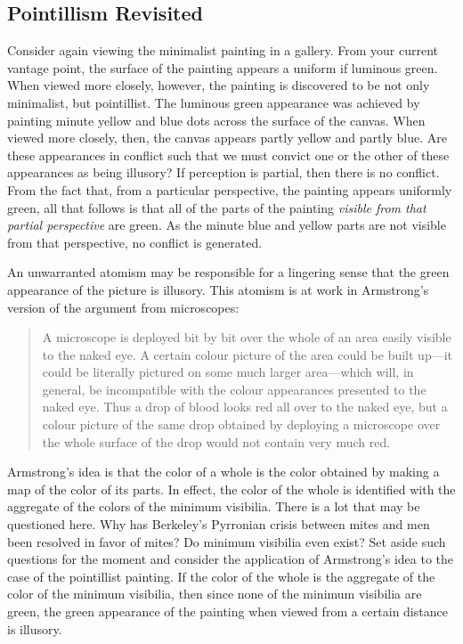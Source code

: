\documentclass[12pt]{article}
\begin{document}

\subsection{Pointillism Revisited}\label{sub:pointillism_revisited} %

Consider again viewing the minimalist painting in a gallery. From your current vantage point, the surface of the painting appears a uniform if luminous green. When viewed more closely, however, the painting is discovered to be not only minimalist, but pointillist. The luminous green appearance was achieved by painting minute yellow and blue dots across the surface of the canvas. When viewed more closely, then, the canvas appears partly yellow and partly blue. Are these appearances in conflict such that we must convict one or the other of these appearances as being illusory? If perception is partial, then there is no conflict. From the fact that, from a particular perspective, the painting appears uniformly green, all that follows is that all of the parts of the painting \emph{visible from that partial perspective} are green. As the minute blue and yellow parts are not visible from that perspective, no conflict is generated.

An unwarranted atomism may be responsible for a lingering sense that the green appearance of the picture is illusory. This atomism is at work in Armstrong's version of the argument from microscopes:
\begin{quote}
	A microscope is deployed bit by bit over the whole of an area easily visible to the naked eye. A certain colour picture of the area could be built up---it could be literally pictured on some much larger area---which will, in general, be incompatible with the colour appearances presented to the naked eye. Thus a drop of blood looks red all over to the naked eye, but a colour picture of the same drop obtained by deploying a microscope over the whole surface of the drop would not contain very much red. \citep[108]{Armstrong:1968nx}
\end{quote}
Armstrong's idea is that the color of a whole is the color obtained by making a map of the color of its parts. In effect, the color of the whole is identified with the aggregate of the colors of the minimum visibilia. There is a lot that may be questioned here. Why has Berkeley's Pyrronian crisis between mites and men been resolved in favor of mites? Do minimum visibilia even exist? Set aside such questions for the moment and consider the application of Armstrong's idea to the case of the pointillist painting. If the color of the whole is the aggregate of the color of the minimum visibilia, then since none of the minimum visibilia are green, the green appearance of the painting when viewed from a certain distance is illusory.
\end{document}
